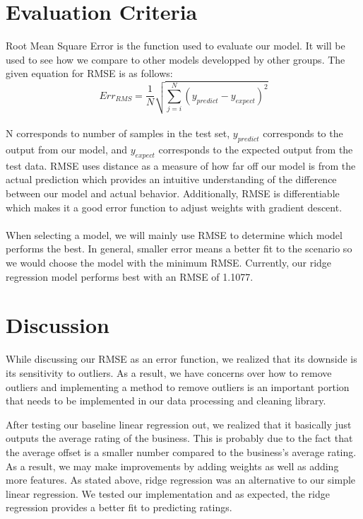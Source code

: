 \documentclass[notitlepage,11pt]{article}
\begin{document}
\section*{Evaluation Criteria}
Root Mean Square Error is the function used to evaluate our model. It will be used to see how we compare to other models developped by other groups. The given equation for RMSE is as follows: \\
\begin{equation}
	Err_{RMS} = \frac{1}{N}\sqrt{\sum_{j=i}^{N} (y_{predict} - y_{expect})^2}
\end{equation} \\
N corresponds to number of samples in the test set, $y_{predict}$ corresponds to the output from our model, and $y_{expect} $ corresponds to the expected output from the test data. RMSE uses distance as a measure of how far off our model is from the actual prediction which provides an intuitive understanding of the difference between our model and actual behavior.  Additionally, RMSE is differentiable which makes it a good error function to adjust weights with gradient descent. \\ \\
When selecting a model, we will mainly use RMSE to determine which model performs the best. In general, smaller error means a better fit to the scenario so we would choose the model with the minimum RMSE. Currently, our ridge regression model performs best with an RMSE of 1.1077.\\
\section*{Discussion}
While discussing our RMSE as an error function, we realized that its downside is its sensitivity to outliers. As a result, we have concerns over how to remove outliers and implementing a method to remove outliers is an important portion that needs to be implemented in our data processing and cleaning library.  

After testing our baseline linear regression out, we realized that it basically just outputs the average rating of the business. This is probably due to the fact that the average offset is a smaller number compared to the business's average rating. As a result, we may make improvements by adding weights as well as adding more features. As stated above, ridge regression was an alternative to our simple linear regression. We tested our implementation and as expected, the ridge regression provides a better fit to predicting ratings. 
\end{document}
